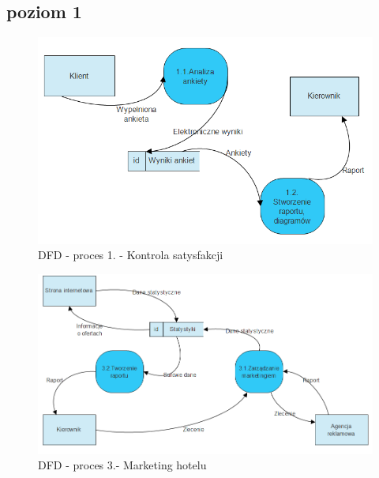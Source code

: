 \documentclass[a4paper, 11pt]{article}
\begin{document}
	
	\subsection{poziom 1}
	\indent
	\begin{figure}[H]%
			\center
			\includegraphics[scale=0.7]{Img/1.png}
			\caption{DFD - proces 1. - Kontrola satysfakcji }
	\end{figure}	
		\begin{figure}[H]%
			\center
			\includegraphics[scale=0.7]{Img/3.png}
			\caption{DFD - proces 3.- Marketing hotelu}
		\end{figure}
\end{document}
